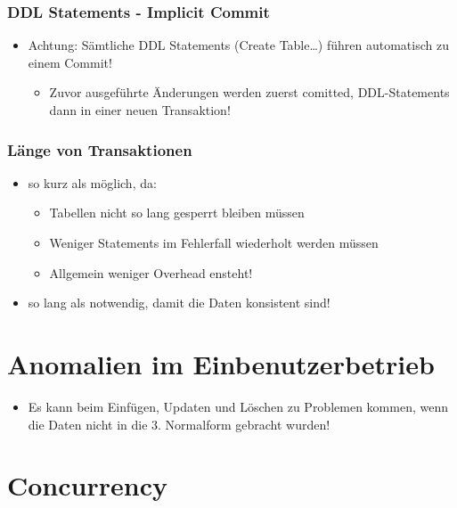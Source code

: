 \subsubsection{DDL Statements - Implicit Commit}
\begin{itemize}
    \item Achtung: Sämtliche DDL Statements (Create Table\dots) führen automatisch zu einem Commit!
    \begin{itemize}
        \item Zuvor ausgeführte Änderungen werden zuerst comitted, DDL-Statements dann in einer neuen Transaktion!
    \end{itemize}
\end{itemize}
\subsubsection{Länge von Transaktionen}
\begin{itemize}
    \item so kurz als möglich, da:
    \begin{itemize}
        \item Tabellen nicht so lang gesperrt bleiben müssen
        \item Weniger Statements im Fehlerfall wiederholt werden müssen
        \item Allgemein weniger Overhead ensteht!
    \end{itemize}
    \item so lang als notwendig, damit die Daten konsistent sind!
\end{itemize}

\section{Anomalien im Einbenutzerbetrieb}
\begin{itemize}
    \item Es kann beim Einfügen, Updaten und Löschen zu Problemen kommen, wenn die Daten nicht in die 3. Normalform gebracht wurden!
\end{itemize}

\section{Concurrency}
